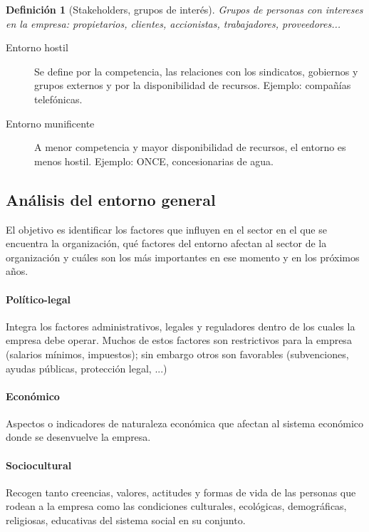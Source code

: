 \documentclass[12pt]{article}
\theoremstyle{definition_wo_parentheses}
\newtheorem{definicion}{Definición}[section]
\begin{document}
\begin{definicion}[Stakeholders, grupos de interés]
Grupos de personas con intereses en la empresa: propietarios, clientes, accionistas, trabajadores, proveedores...
\end{definicion}

\begin{description}
\item[Entorno hostil] Se define por la competencia, las relaciones con los sindicatos, gobiernos y grupos externos y por la disponibilidad de recursos. Ejemplo: compañías telefónicas.
\item[Entorno munificente] A menor competencia y mayor disponibilidad de recursos, el entorno es menos hostil. Ejemplo: ONCE, concesionarias de agua.
\end{description}

\subsection{Análisis del entorno general}

El objetivo es identificar los factores que influyen en el sector en el que se encuentra la organización, qué factores del entorno afectan al sector de la organización y cuáles son los más importantes en ese momento y en los próximos años.

\paragraph{Político-legal} Integra los factores administrativos, legales y reguladores dentro de los cuales la empresa debe operar. Muchos de estos factores son restrictivos para la empresa (salarios mínimos, impuestos); sin embargo otros son favorables (subvenciones, ayudas públicas, protección legal, ...)

\paragraph{Económico} Aspectos o indicadores de naturaleza económica que afectan al sistema económico donde se desenvuelve la empresa.

\paragraph{Sociocultural} Recogen tanto creencias, valores, actitudes y formas de vida de las personas que rodean a la empresa como las condiciones culturales, ecológicas, demográficas, religiosas, educativas del sistema social en su conjunto.
\end{document}
